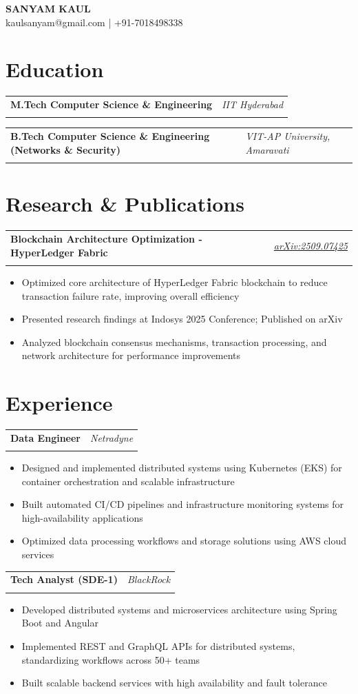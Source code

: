 \documentclass[11pt,a4paper]{article}
\makeatletter
\newcommand{\resumeItem}[1]{\item\small{#1}}
\newlength{\resumeLeftCol}
\newlength{\resumeRightCol}
\newcommand{\resumeHeading}[4]{
  \begin{tabular*}{\textwidth}{@{}p{\resumeLeftCol}@{\extracolsep{\fill}}>{\raggedleft\arraybackslash}p{\resumeRightCol}@{}}
    \textbf{#1} & \textit{#2} \\
    & \textit{\ifstrempty{#4}{#3}{#3 \ #4}}
  \end{tabular*}
  \vspace{-4pt}
}
\makeatother
\begin{document}
\begin{center}
    {\Huge\bfseries SANYAM KAUL} \\
    \vspace{2pt}
    \small kaulsanyam@gmail.com | +91-7018498338
\end{center}

\section{Education}
\resumeHeading{M.Tech Computer Science \& Engineering}{IIT Hyderabad}{2025}{CGPA: 8.90}
\resumeHeading{B.Tech Computer Science \& Engineering (Networks \& Security)}{VIT-AP University, Amaravati}{2021}{CGPA: 8.90}

\section{Research \& Publications}
\resumeHeading{Blockchain Architecture Optimization - HyperLedger Fabric}{\href{https://arxiv.org/abs/2509.07425}{arXiv:2509.07425}}{Indosys 2025 Conference}{}
\begin{itemize}[leftmargin=*,noitemsep,topsep=0pt]
    \resumeItem{Optimized core architecture of HyperLedger Fabric blockchain to reduce transaction failure rate, improving overall efficiency}
    \resumeItem{Presented research findings at Indosys 2025 Conference; Published on arXiv}
    \resumeItem{Analyzed blockchain consensus mechanisms, transaction processing, and network architecture for performance improvements}
\end{itemize}

\section{Experience}
\resumeHeading{Data Engineer}{Netradyne}{July 2025 - Present}{}
\begin{itemize}[leftmargin=*,noitemsep,topsep=0pt]
    \resumeItem{Designed and implemented distributed systems using Kubernetes (EKS) for container orchestration and scalable infrastructure}
    \resumeItem{Built automated CI/CD pipelines and infrastructure monitoring systems for high-availability applications}
    \resumeItem{Optimized data processing workflows and storage solutions using AWS cloud services}
\end{itemize}

\resumeHeading{Tech Analyst (SDE-1)}{BlackRock}{July 2021 - June 2023}{}
\begin{itemize}[leftmargin=*,noitemsep,topsep=0pt]
    \resumeItem{Developed distributed systems and microservices architecture using Spring Boot and Angular}
    \resumeItem{Implemented REST and GraphQL APIs for distributed systems, standardizing workflows across 50+ teams}
    \resumeItem{Built scalable backend services with high availability and fault tolerance}
\end{itemize}
\end{document}
